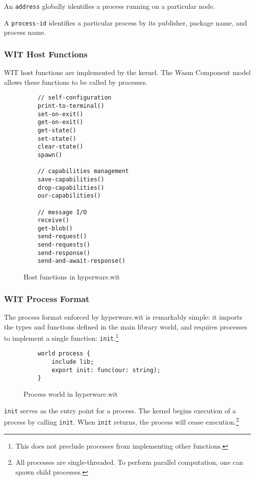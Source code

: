 \documentclass[runningheads]{llncs}
\begin{document}
An \verb|address| globally identifies a process running on a particular node.

A \verb|process-id| identifies a particular process by its publisher, package name, and process name.

\subsubsection{WIT Host Functions}
\label{sec:oswitfuncs}

WIT host functions are implemented by the kernel.
The Wasm Component model allows these functions to be called by processes.

\begin{figure}[H]
    \centering
    \begin{verbatim}
    // self-configuration
    print-to-terminal()
    set-on-exit()
    get-on-exit()
    get-state()
    set-state()
    clear-state()
    spawn()

    // capabilities management
    save-capabilities()
    drop-capabilities()
    our-capabilities()

    // message I/O
    receive()
    get-blob()
    send-request()
    send-requests()
    send-response()
    send-and-await-response()
    \end{verbatim}
    \caption{Host functions in hyperware.wit}
    \label{fig:WIT Functions}
\end{figure}

\subsubsection{WIT Process Format}
\label{sec:oswitprocess}

The process format enforced by hyperware.wit is remarkably simple: it imports the types and functions defined in the main library world, and requires processes to implement a single function: \verb|init|.\footnote{This does not preclude processes from implementing other functions.}

\begin{figure}[H]
    \centering
    \begin{verbatim}
    world process {
        include lib;
        export init: func(our: string);
    }
    \end{verbatim}
    \caption{Process world in hyperware.wit}
    \label{fig:Process world}
\end{figure}

\verb|init| serves as the entry point for a process.
The kernel begins execution of a process by calling \verb|init|.
When \verb|init| returns, the process will cease execution.\footnote{All processes are single-threaded. To perform parallel computation, one can spawn child processes.}
\end{document}
